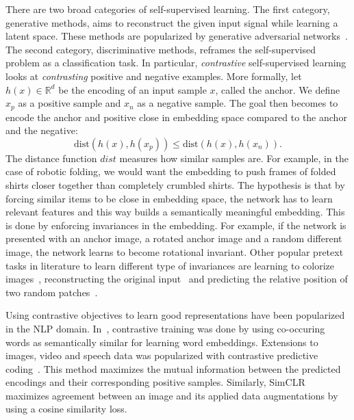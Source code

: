 \documentclass[\home/main.tex]{subfiles}
\begin{document}
There are two broad categories of self-supervised learning. The first category, generative methods, aims to reconstruct the given input signal while learning a latent space. These methods are popularized by generative adversarial networks~\autocite{goodfellow2014generative}. The second category, discriminative methods, reframes the self-supervised problem as a classification task. In particular, \emph{contrastive} self-supervised learning looks at \textit{contrasting} positive and negative examples. More formally, let $h(x) \in \mathbb{R}^d$ be the encoding of an input sample $x$, called the anchor. We define $x_p$ as a positive sample and $x_n$ as a negative sample. The goal then becomes to encode the anchor and positive close in embedding space compared to the anchor and the negative:
\begin{equation*}
	\text{dist}\left( h(x),h(x_p) \right) \leq \text{dist}\left( h(x),h(x_n) \right) .
\end{equation*}
The distance function $\textit{dist}$ measures how similar samples are. For example, in the case of robotic folding, we would want the embedding to push frames of folded shirts closer together than completely crumbled shirts. The hypothesis is that by forcing similar items to be close in embedding space, the network has to learn relevant features and this way builds a semantically meaningful embedding. This is done by enforcing invariances in the embedding. For example, if the network is presented with an anchor image, a rotated anchor image and a random different image, the network learns to become rotational invariant. Other popular pretext tasks in literature to learn different type of invariances are learning to colorize images~\cite{Zhang2016Color}, reconstructing the original input~\cite{Pathak2016} and predicting the relative position of two random patches~\cite{Doersch2015}.


Using contrastive objectives to learn good representations have been popularized in the NLP domain. In~\autocite{mikolov2013distributed}, contrastive training was done by using co-occuring words as semantically similar for learning word embeddings. Extensions to images, video and speech data was popularized with contrastive predictive coding~\autocite{oord2018representation}. This method maximizes the mutual information between the predicted encodings and their corresponding positive samples. Similarly, SimCLR~\autocite{chen2020simple} maximizes agreement between an image and its applied data augmentations by using a cosine similarity loss.
\end{document}
